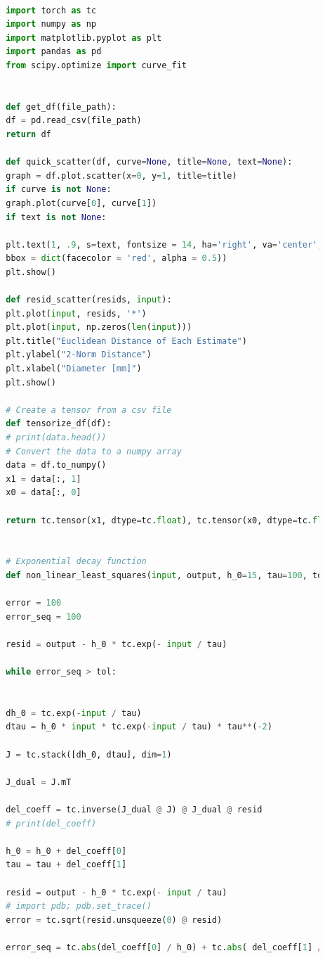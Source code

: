 \documentclass[]{report}
\begin{document}
	
	\begin{lstlisting}[language=Python]
		
		import torch as tc
		import numpy as np
		import matplotlib.pyplot as plt
		import pandas as pd
		from scipy.optimize import curve_fit
		
		
		def get_df(file_path):
		df = pd.read_csv(file_path)
		return df
		
		def quick_scatter(df, curve=None, title=None, text=None):
		graph = df.plot.scatter(x=0, y=1, title=title)
		if curve is not None:
		graph.plot(curve[0], curve[1])
		if text is not None:
		
		plt.text(1, .9, s=text, fontsize = 14, ha='right', va='center', transform=plt.gca().transAxes,
		bbox = dict(facecolor = 'red', alpha = 0.5))
		plt.show()
		
		def resid_scatter(resids, input):
		plt.plot(input, resids, '*')
		plt.plot(input, np.zeros(len(input)))
		plt.title("Euclidean Distance of Each Estimate")
		plt.ylabel("2-Norm Distance")
		plt.xlabel("Diameter [mm]")
		plt.show()
		
		# Create a tensor from a csv file
		def tensorize_df(df):
		# print(data.head())
		# Convert the data to a numpy array
		data = df.to_numpy()
		x1 = data[:, 1]
		x0 = data[:, 0]
		
		return tc.tensor(x1, dtype=tc.float), tc.tensor(x0, dtype=tc.float)
		
		
		# Exponential decay function
		def non_linear_least_squares(input, output, h_0=15, tau=100, tol = 1e-7):
		
		error = 100
		error_seq = 100
		
		resid = output - h_0 * tc.exp(- input / tau)
		
		while error_seq > tol:
		
		
		dh_0 = tc.exp(-input / tau)
		dtau = h_0 * input * tc.exp(-input / tau) * tau**(-2)
		
		J = tc.stack([dh_0, dtau], dim=1)
		
		J_dual = J.mT
		
		del_coeff = tc.inverse(J_dual @ J) @ J_dual @ resid
		# print(del_coeff)
		
		h_0 = h_0 + del_coeff[0]
		tau = tau + del_coeff[1]
		
		resid = output - h_0 * tc.exp(- input / tau)
		# import pdb; pdb.set_trace()
		error = tc.sqrt(resid.unsqueeze(0) @ resid)
		
		error_seq = tc.abs(del_coeff[0] / h_0) + tc.abs( del_coeff[1] / tau) 
		

\end{lstlisting}
\end{document}
